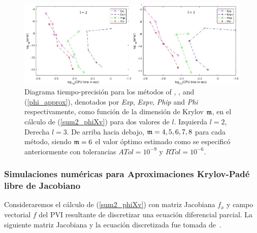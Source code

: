 \begin{figure}[ht]
	\includegraphics[scale=0.55]{Graphics/phil2l3.jpg}
	\caption{Diagrama tiempo-precisión para los métodos of \cite{hochbruck1997krylov}, \cite{sidje1998expokit}, \cite{niesen2012algorithm} and (\ref{phi_approx}), denotados por \textit{Exp}, \textit{Expv}, \textit{Phip} and \textit{Phi} respectivamente, como función de la dimensión de Krylov $\mathfrak{m}$, en el cálculo de  (\ref{sum2_phiXv}) para dos valores de $l$. Izquierda $l=2$, Derecha $l=3$. De arriba hacia debajo, $\mathfrak{m}=4,5,6,7,8$ para cada método, siendo $\mathfrak{m}=6$ el valor óptimo estimado como se especificó anteriormente con tolerancias $ATol=10^{-9}$ y $RTol=10^{-6}$.}
	\label{fig:SumPhi}
\end{figure}

\subsubsection{Simulaciones numéricas para Aproximaciones Krylov-Padé libre de Jacobiano}
Consideraremos el cálculo de (\ref{sum2_phiXv}) con matriz Jacobiana $f_x$ y campo vectorial $f$ del PVI resultante de discretizar una ecuación diferencial parcial. La siguiente matriz Jacobiana y la ecuación discretizada fue tomada de~\cite{tokman2006efficient}.

